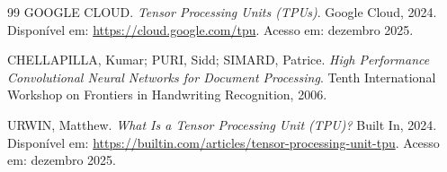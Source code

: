 \documentclass[12pt,a4paper]{article}
\begin{document}
\begin{thebibliography}{99}
GOOGLE CLOUD.
\textit{Tensor Processing Units (TPUs)}.
Google Cloud, 2024.
Disponível em: \url{https://cloud.google.com/tpu}.
Acesso em: dezembro 2025.

CHELLAPILLA, Kumar; PURI, Sidd; SIMARD, Patrice.
\textit{High Performance Convolutional Neural Networks for Document Processing}.
Tenth International Workshop on Frontiers in Handwriting Recognition, 2006.

URWIN, Matthew.
\textit{What Is a Tensor Processing Unit (TPU)?}
Built In, 2024.
Disponível em: \url{https://builtin.com/articles/tensor-processing-unit-tpu}.
Acesso em: dezembro 2025.

\end{thebibliography}
\end{document}
